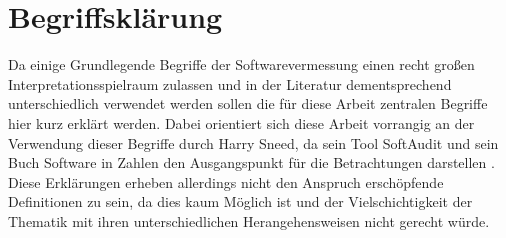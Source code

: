 \documentclass[gb,ngerman]{stthesis}
\begin{document}
  		\section{Begriffsklärung}
  		Da einige Grundlegende Begriffe der Softwarevermessung einen recht großen Interpretationsspielraum zulassen und in der Literatur dementsprechend unterschiedlich verwendet werden sollen die für diese Arbeit zentralen Begriffe hier kurz erklärt werden. Dabei orientiert sich diese Arbeit vorrangig an der Verwendung dieser Begriffe durch Harry Sneed, da sein Tool SoftAudit und sein Buch Software in Zahlen den Ausgangspunkt für die Betrachtungen darstellen \cite{SoftwareInZahlen}. Diese Erklärungen erheben allerdings nicht den Anspruch erschöpfende Definitionen zu sein, da dies kaum Möglich ist und der Vielschichtigkeit der Thematik mit ihren unterschiedlichen Herangehensweisen nicht gerecht würde. \newline
\end{document}
